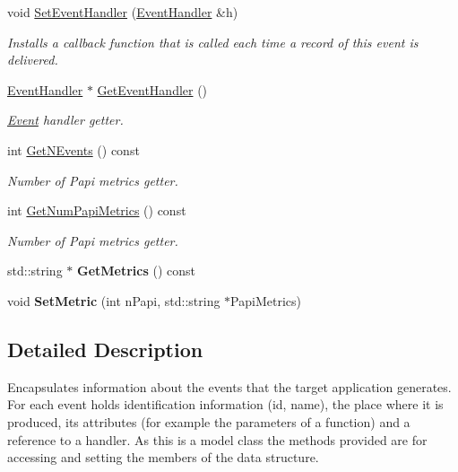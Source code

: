 \begin{DoxyCompactItemize}
void \hyperlink{class_model_1_1_event_a326a936a45b9a0923c8d6cc1ae99839e}{Set\-Event\-Handler} (\hyperlink{class_model_1_1_event_handler}{Event\-Handler} \&h)
\begin{DoxyCompactList}\small\item\em Installs a callback function that is called each time a record of this event is delivered. \end{DoxyCompactList}\item 
\hyperlink{class_model_1_1_event_handler}{Event\-Handler} $\ast$ \hyperlink{class_model_1_1_event_a4ccaa201a88d5134e41d5fc94af2063b}{Get\-Event\-Handler} ()
\begin{DoxyCompactList}\small\item\em \hyperlink{class_model_1_1_event}{Event} handler getter. \end{DoxyCompactList}\item 
int \hyperlink{class_model_1_1_event_a246ade8614bdf20a642573280518ce0c}{Get\-N\-Events} () const 
\begin{DoxyCompactList}\small\item\em Number of Papi metrics getter. \end{DoxyCompactList}\item 
int \hyperlink{class_model_1_1_event_a87c4fcf12c67448d5d9d1df8c43f90e5}{Get\-Num\-Papi\-Metrics} () const 
\begin{DoxyCompactList}\small\item\em Number of Papi metrics getter. \end{DoxyCompactList}\item 
\hypertarget{class_model_1_1_event_a99f40ff3240bde174c92e07228a208dc}{std\-::string $\ast$ {\bfseries Get\-Metrics} () const }\label{class_model_1_1_event_a99f40ff3240bde174c92e07228a208dc}

\item 
\hypertarget{class_model_1_1_event_a00e550f2db2bea0bab4632103e4a470e}{void {\bfseries Set\-Metric} (int n\-Papi, std\-::string $\ast$Papi\-Metrics)}\label{class_model_1_1_event_a00e550f2db2bea0bab4632103e4a470e}

\end{DoxyCompactItemize}


\subsection{Detailed Description}
Encapsulates information about the events that the target application generates. For each event holds identification information (id, name), the place where it is produced, its attributes (for example the parameters of a function) and a reference to a handler. As this is a model class the methods provided are for accessing and setting the members of the data structure. 

